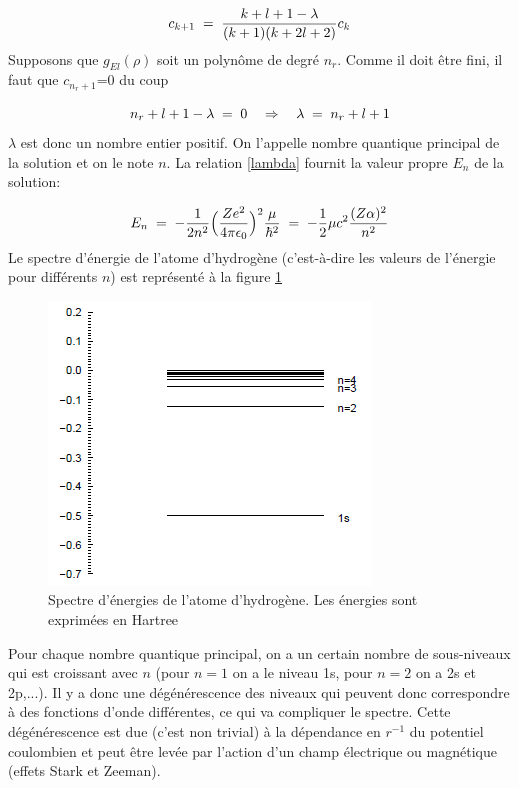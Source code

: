 \begin{equation}
    c_{k+1}\; = \;\dfrac{k+l+1-\lambda}{(k+1)(k+2l+2)}c_k
\end{equation}
Supposons que $g_{El}(\rho)$ soit un polynôme de degré $n_r$. Comme il doit être fini, il faut que $c_{n_{r}+1}$=0 du coup

\[
    n_r+l+1-\lambda\; = \;0 \quad \Rightarrow \quad \lambda\; = \; n_r +l+1
\]
$\lambda$ est donc un nombre entier positif. On l'appelle nombre quantique principal de la solution et on le note $n$. La relation \eqref{lambda} fournit la valeur propre $E_n$ de la solution:

\begin{equation}
    E_n\; = \; -\dfrac{1}{2n^2}\Big(\dfrac{Ze^2}{4\pi\epsilon_0}\Big)^2\dfrac{\mu}{\hbar^2}\; = \; -\dfrac{1}{2}\mu c^2 \dfrac{(Z\alpha)^2}{n^2}
\end{equation}
Le spectre d'énergie de l'atome d'hydrogène (c'est-à-dire les valeurs de l'énergie pour différents $n$) est représenté à la figure \ref{fig:spectreH}

\begin{figure}[tph]
    \centering
    \includegraphics{Images2/spectreH.PNG}
    \caption{Spectre d'énergies de l'atome d'hydrogène. Les énergies sont exprimées en Hartree}
    \label{fig:spectreH}
\end{figure}

Pour chaque nombre quantique principal, on a un certain nombre de sous-niveaux qui est croissant avec $n$ (pour $n=1$ on a le niveau 1s, pour $n=2$ on a 2s et 2p,...). Il y a donc une dégénérescence des niveaux qui peuvent donc correspondre à des fonctions d'onde différentes, ce qui va compliquer le spectre. Cette dégénérescence est due (c'est non trivial) à la dépendance en $r^{-1}$ du potentiel coulombien et peut être levée par l'action d'un champ électrique ou magnétique (effets Stark et Zeeman). \\

